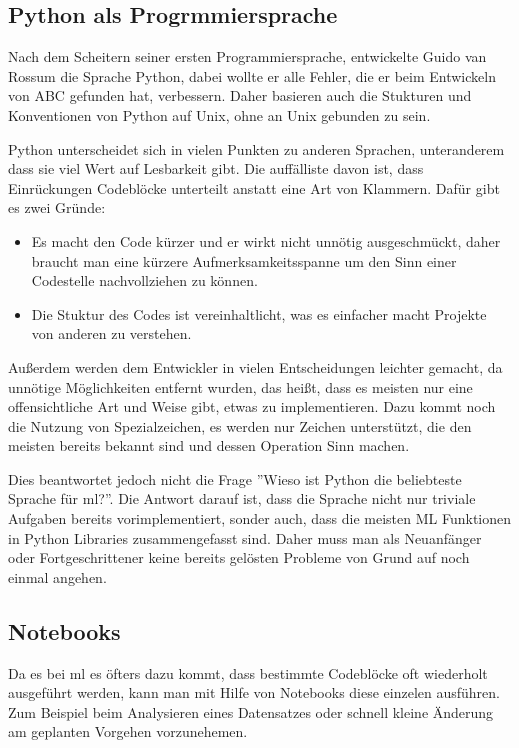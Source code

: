 \subsection{Python als Progrmmiersprache}

Nach dem Scheitern seiner ersten Programmiersprache, entwickelte Guido van Rossum die Sprache Python, dabei wollte er alle Fehler, die er beim Entwickeln von ABC gefunden hat, verbessern. Daher basieren auch die Stukturen und Konventionen von Python auf Unix, ohne an Unix gebunden zu sein. 

Python unterscheidet sich in vielen Punkten zu anderen Sprachen, unteranderem dass sie viel Wert auf Lesbarkeit gibt. Die auffälliste davon ist, dass Einrückungen Codeblöcke unterteilt anstatt eine Art von Klammern. Dafür gibt es zwei Gründe:

\begin{itemize}
    \item Es macht den Code kürzer und er wirkt nicht unnötig ausgeschmückt, daher braucht man eine kürzere Aufmerksamkeitsspanne um den Sinn einer Codestelle nachvollziehen zu können.
    \item Die Stuktur des Codes ist vereinhaltlicht, was es einfacher macht Projekte von anderen zu verstehen.
\end{itemize}

Außerdem werden dem Entwickler in vielen Entscheidungen leichter gemacht, da unnötige Möglichkeiten entfernt wurden, das heißt, dass es meisten nur eine offensichtliche Art und Weise gibt, etwas zu implementieren. Dazu kommt noch die Nutzung von Spezialzeichen, es werden nur Zeichen unterstützt, die den meisten bereits bekannt sind und dessen Operation Sinn machen. \cite{PythonGVR:online}

Dies beantwortet jedoch nicht die Frage ''Wieso ist Python die beliebteste Sprache für \gls{ml}?''. Die Antwort darauf ist, dass die Sprache nicht nur triviale Aufgaben bereits vorimplementiert, sonder auch, dass die meisten ML Funktionen in Python Libraries zusammengefasst sind. Daher muss man als Neuanfänger oder Fortgeschrittener keine bereits gelösten Probleme von Grund auf noch einmal angehen.

\subsection{Notebooks}

Da es bei \gls{ml} es öfters dazu kommt, dass bestimmte Codeblöcke oft wiederholt ausgeführt werden, kann man mit Hilfe von Notebooks diese einzelen ausführen. Zum Beispiel beim Analysieren eines Datensatzes oder schnell kleine Änderung am geplanten Vorgehen vorzunehemen.

